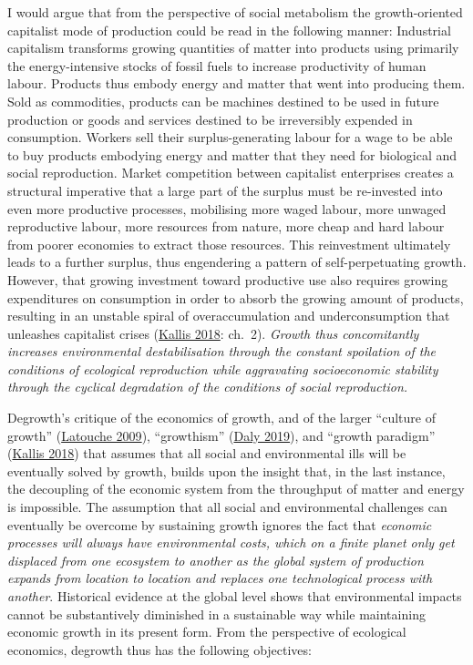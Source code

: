 \documentclass[a4paper, nobind]{templates/ociamthesis}
\begin{document}
I would argue that from the perspective of social metabolism the growth-oriented capitalist mode of production could be read in the following manner: Industrial capitalism transforms growing quantities of matter into products using primarily the energy-intensive stocks of fossil fuels to increase productivity of human labour. Products thus embody energy and matter that went into producing them. Sold as commodities, products can be machines destined to be used in future production or goods and services destined to be irreversibly expended in consumption. Workers sell their surplus-generating labour for a wage to be able to buy products embodying energy and matter that they need for biological and social reproduction. Market competition between capitalist enterprises creates a structural imperative that a large part of the surplus must be re-invested into even more productive processes, mobilising more waged labour, more unwaged reproductive labour, more resources from nature, more cheap and hard labour from poorer economies to extract those resources. This reinvestment ultimately leads to a further surplus, thus engendering a pattern of self-perpetuating growth. However, that growing investment toward productive use also requires growing expenditures on consumption in order to absorb the growing amount of products, resulting in an unstable spiral of overaccumulation and underconsumption that unleashes capitalist crises (\protect\hyperlink{ref-kallis_degrowth_2018}{Kallis 2018}: ch.~2). \emph{Growth thus concomitantly increases environmental destabilisation through the constant spoilation of the conditions of ecological reproduction while aggravating socioeconomic stability through the cyclical degradation of the conditions of social reproduction.}

Degrowth's critique of the economics of growth, and of the larger ``culture of growth'' (\protect\hyperlink{ref-latouche_farewell_2009}{Latouche 2009}), ``growthism'' (\protect\hyperlink{ref-daly_growthism_2019}{Daly 2019}), and ``growth paradigm'' (\protect\hyperlink{ref-kallis_degrowth_2018}{Kallis 2018}) that assumes that all social and environmental ills will be eventually solved by growth, builds upon the insight that, in the last instance, the decoupling of the economic system from the throughput of matter and energy is impossible. The assumption that all social and environmental challenges can eventually be overcome by sustaining growth ignores the fact that \emph{economic processes will always have environmental costs, which on a finite planet only get displaced from one ecosystem to another as the global system of production expands from location to location and replaces one technological process with another}. Historical evidence at the global level shows that environmental impacts cannot be substantively diminished in a sustainable way while maintaining economic growth in its present form. From the perspective of ecological economics, degrowth thus has the following objectives:
\end{document}
